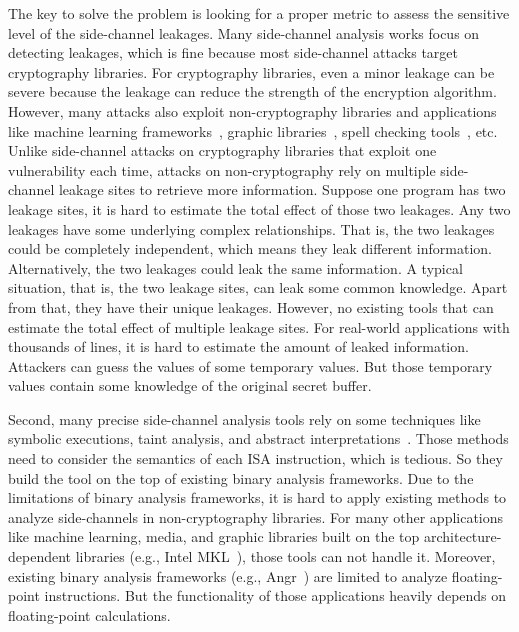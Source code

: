 The key to solve the problem is looking for a proper metric to assess the sensitive level of the side-channel leakages. Many side-channel analysis works focus on detecting leakages, which is fine because most side-channel attacks target cryptography libraries. For cryptography libraries, even a minor leakage can be severe because the leakage can reduce the strength of the encryption algorithm. However, many attacks also exploit non-cryptography libraries and applications like machine learning frameworks~\cite{yan2020cache,hong2018security}, graphic libraries~\cite{wang2019unveiling}, spell checking tools~\cite{xu2015controlled}, etc. Unlike side-channel attacks on cryptography libraries that exploit one vulnerability each time, attacks on non-cryptography rely on multiple side-channel leakage sites to retrieve more information. Suppose one program has two leakage sites, it is hard to estimate the total effect of those two leakages. Any two leakages have some underlying complex relationships. That is, the two leakages could be completely independent, which means they leak different information. Alternatively, the two leakages could leak the same information. A typical situation, that is, the two leakage sites, can leak some common knowledge. Apart from that, they have their unique leakages. However, no existing tools that can estimate the total effect of multiple leakage sites. For real-world applications with thousands of lines, it is hard to estimate the amount of leaked information. Attackers can guess the values of some temporary values. But those temporary values contain some knowledge of the original secret buffer.

Second, many precise side-channel analysis tools rely on some techniques like symbolic executions, taint analysis, and abstract interpretations~\cite{wang2017cached,doychev2015cacheaudit,brotzman2019casym,wang2019identifying}. Those methods need to consider the semantics of each ISA instruction, which is tedious. So they build the tool on the top of existing binary analysis frameworks. Due to the limitations of binary analysis frameworks, it is hard to apply existing methods to analyze side-channels in non-cryptography libraries. For many other applications like machine learning, media, and graphic libraries built on the top architecture-dependent libraries (e.g., Intel MKL~\cite{wang2014intel}), those tools can not handle it. Moreover, existing binary analysis frameworks (e.g., Angr~\cite{shoshitaishvili2016state}) are limited to analyze floating-point instructions. But the functionality of those applications heavily depends on floating-point calculations.

